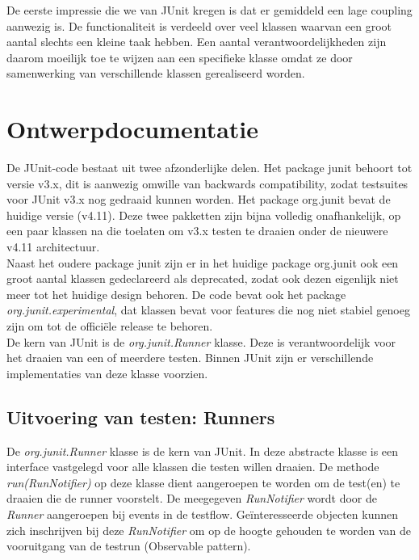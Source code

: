 \documentclass[i1]{oss}
\begin{document}
De eerste impressie die we van JUnit kregen is dat er gemiddeld een lage coupling aanwezig is. De functionaliteit is verdeeld over veel klassen waarvan een groot aantal slechts een kleine taak hebben. Een aantal verantwoordelijkheden zijn daarom moeilijk toe te wijzen aan een specifieke klasse omdat ze door samenwerking van verschillende klassen gerealiseerd worden.\\

\section{Ontwerpdocumentatie}

De JUnit-code bestaat uit twee afzonderlijke delen. Het package junit behoort tot versie v3.x, dit is aanwezig omwille van backwards compatibility, zodat testsuites voor JUnit v3.x nog gedraaid kunnen worden. Het package org.junit bevat de huidige versie (v4.11). Deze twee pakketten zijn bijna volledig onafhankelijk, op een paar klassen na die toelaten om v3.x testen te draaien onder de nieuwere v4.11 architectuur.\\

Naast het oudere package junit zijn er in het huidige package org.junit ook een groot aantal klassen gedeclareerd als deprecated, zodat ook dezen eigenlijk niet meer tot het huidige design behoren. De code bevat ook het package \emph{org.junit.experimental}, dat klassen bevat voor features die nog niet stabiel genoeg zijn om tot de offici\"ele release te behoren.\\

De kern van JUnit is de \emph{org.junit.Runner} klasse. Deze is verantwoordelijk voor het draaien van een of meerdere testen. Binnen JUnit zijn er verschillende implementaties van deze klasse voorzien. \\

\subsection{Uitvoering van testen: Runners}

De \emph{org.junit.Runner} klasse is de kern van JUnit. In deze abstracte klasse is een interface vastgelegd voor alle klassen die testen willen draaien. De methode \emph{run(RunNotifier)} op deze klasse dient aangeroepen te worden om de test(en) te draaien die de runner voorstelt. De meegegeven \emph{RunNotifier} wordt door de \emph{Runner} aangeroepen bij events in de testflow. Ge\"interesseerde objecten kunnen zich inschrijven bij deze \emph{RunNotifier} om op de hoogte gehouden te worden van de vooruitgang van de testrun (Observable pattern).\\
\end{document}
